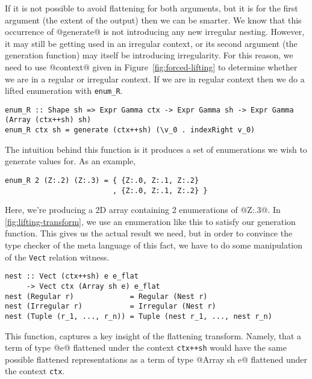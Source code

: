 If it is not possible to avoid flattening for both arguments, but it is for the first argument (the extent of the output) then we can be smarter. We know that this occurrence of @generate@ is not introducing any new irregular nesting. However, it may still be getting used in an irregular context, or its second argument (the generation function) may itself be introducing irregularity. For this reason, we need to use @context@ given in Figure~\ref{fig:forced-lifting} to determine whether we are in a regular or irregular context. If we are in regular context then we do a lifted enumeration with \lstinline[style=ndp]{enum_R}.
%
\begin{lstlisting}[style=ndp]
enum_R :: Shape sh => Expr Gamma ctx -> Expr Gamma sh -> Expr Gamma (Array (ctx++sh) sh)
enum_R ctx sh = generate (ctx++sh) (\v_0 . indexRight v_0)
\end{lstlisting}
%
The intuition behind this function is it produces a set of enumerations we wish to generate values for. As an example,
%
\begin{lstlisting}[style=ndp]
enum_R 2 (Z:.2) (Z:.3) = { {Z:.0, Z:.1, Z:.2}
                         , {Z:.0, Z:.1, Z:.2} }
\end{lstlisting}
%
Here, we're producing a 2D array containing 2 enumerations of @Z:.3@. In \ref{fig:lifting-transform}, we use an enumeration like this to satisfy our generation function. This gives us the actual result we need, but in order to convince the type checker of the meta language of this fact, we have to do some manipulation of the \lstinline[style=ndp]{Vect} relation witness.
%
\begin{lstlisting}[style=ndp]
nest :: Vect (ctx++sh) e e_flat
     -> Vect ctx (Array sh e) e_flat
nest (Regular r)             = Regular (Nest r)
nest (Irregular r)           = Irregular (Nest r)
nest (Tuple (r_1, ..., r_n)) = Tuple (nest r_1, ..., nest r_n)
\end{lstlisting}
%
This function, captures a key insight of the flattening transform. Namely, that a term of type @e@ flattened under the context \lstinline[style=ndp]{ctx++sh} would have the same possible flattened representations as a term of type @Array sh e@ flattened under the context \lstinline[style=ndp]{ctx}.

